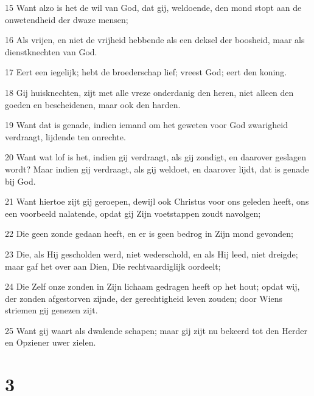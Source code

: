 \par 15 Want alzo is het de wil van God, dat gij, weldoende, den mond stopt aan de onwetendheid der dwaze mensen;
\par 16 Als vrijen, en niet de vrijheid hebbende als een deksel der boosheid, maar als dienstknechten van God.
\par 17 Eert een iegelijk; hebt de broederschap lief; vreest God; eert den koning.
\par 18 Gij huisknechten, zijt met alle vreze onderdanig den heren, niet alleen den goeden en bescheidenen, maar ook den harden.
\par 19 Want dat is genade, indien iemand om het geweten voor God zwarigheid verdraagt, lijdende ten onrechte.
\par 20 Want wat lof is het, indien gij verdraagt, als gij zondigt, en daarover geslagen wordt? Maar indien gij verdraagt, als gij weldoet, en daarover lijdt, dat is genade bij God.
\par 21 Want hiertoe zijt gij geroepen, dewijl ook Christus voor ons geleden heeft, ons een voorbeeld nalatende, opdat gij Zijn voetstappen zoudt navolgen;
\par 22 Die geen zonde gedaan heeft, en er is geen bedrog in Zijn mond gevonden;
\par 23 Die, als Hij gescholden werd, niet wederschold, en als Hij leed, niet dreigde; maar gaf het over aan Dien, Die rechtvaardiglijk oordeelt;
\par 24 Die Zelf onze zonden in Zijn lichaam gedragen heeft op het hout; opdat wij, der zonden afgestorven zijnde, der gerechtigheid leven zouden; door Wiens striemen gij genezen zijt.
\par 25 Want gij waart als dwalende schapen; maar gij zijt nu bekeerd tot den Herder en Opziener uwer zielen.

\chapter{3}

